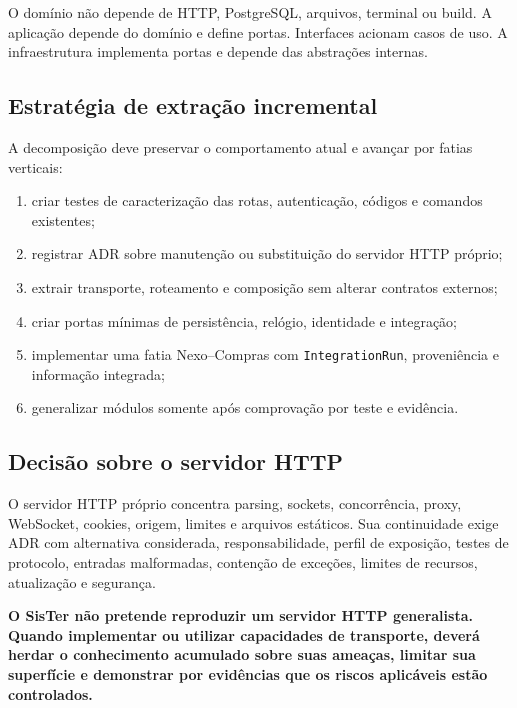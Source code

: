 \documentclass[11pt,a4paper,oneside]{article}
\begin{document}
\begin{decisao}
O domínio não depende de HTTP, PostgreSQL, arquivos, terminal ou build. A aplicação depende do domínio e define portas. Interfaces acionam casos de uso. A infraestrutura implementa portas e depende das abstrações internas.
\end{decisao}

\subsection{Estratégia de extração incremental}
A decomposição deve preservar o comportamento atual e avançar por fatias verticais:
\begin{enumerate}
  \item criar testes de caracterização das rotas, autenticação, códigos e comandos existentes;
  \item registrar ADR sobre manutenção ou substituição do servidor HTTP próprio;
  \item extrair transporte, roteamento e composição sem alterar contratos externos;
  \item criar portas mínimas de persistência, relógio, identidade e integração;
  \item implementar uma fatia Nexo--Compras com \texttt{IntegrationRun}, proveniência e informação integrada;
  \item generalizar módulos somente após comprovação por teste e evidência.
\end{enumerate}

\subsection{Decisão sobre o servidor HTTP}
O servidor HTTP próprio concentra parsing, sockets, concorrência, proxy, WebSocket, cookies, origem, limites e arquivos estáticos. Sua continuidade exige ADR com alternativa considerada, responsabilidade, perfil de exposição, testes de protocolo, entradas malformadas, contenção de exceções, limites de recursos, atualização e segurança.

\begin{principio}
\textbf{O SisTer não pretende reproduzir um servidor HTTP generalista. Quando implementar ou utilizar capacidades de transporte, deverá herdar o conhecimento acumulado sobre suas ameaças, limitar sua superfície e demonstrar por evidências que os riscos aplicáveis estão controlados.}
\end{principio}
\end{document}
